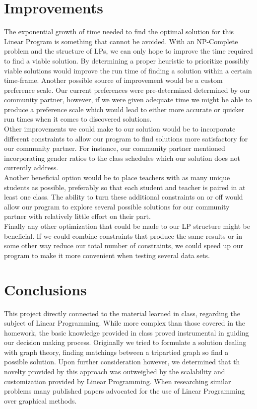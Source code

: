 \documentclass[11pt]{article}
\begin{document}
\section{Improvements}
The exponential growth of time needed to find the optimal solution for this Linear Program is something that cannot be avoided. With an NP-Complete problem and the structure of LPs, we can only hope to improve the time required to find a viable solution. By determining a proper heuristic to prioritize possibly viable solutions would improve the run time of finding a solution within a certain time-frame. Another possible source of improvement would be a custom preference scale. Our current preferences were pre-determined determined by our community partner, however, if we were given adequate time we might be able to produce a preference scale which would lead to either more accurate or quicker run times when it comes to discovered solutions.\\
\indent Other improvements we could make to our solution would be to incorporate different constraints to allow our program to find solutions more satisfactory for our community partner. For instance, our community partner mentioned incorporating gender ratios to the class schedules which our solution does not currently address.\\
\indent Another beneficial option would be to place teachers with as many unique students as possible, preferably so that each student and teacher is paired in at least one class. The ability to turn these additional constraints on or off would allow our program to explore several possible solutions for our community partner with relatively little effort on their part.\\
\indent Finally any other optimization that could be made to our LP structure might be beneficial. If we could combine constraints that produce the same results or in some other way reduce our total number of constraints, we could speed up our program to make it more convenient when testing several data sets.

\section{Conclusions}
This project directly connected to the material learned in class, regarding the subject of Linear Programming. While more complex than those covered in the homework, the basic knowledge provided in class proved instrumental in guiding our decision making process. Originally we tried to formulate a solution dealing with graph theory, finding matchings between a tripartied graph so find a possible solution. Upon further consideration however, we determined that th novelty provided by this approach was outweighed by the scalability and customization provided by Linear Programming. When researching similar problems many published papers advocated for the use of Linear Programming over graphical methods.
\end{document}

